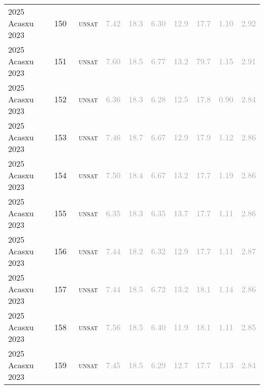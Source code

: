 \begin{center}
{\begin{longtable}{@{}llllllllll@{}}
2025 Acasxu 2023 & 150 & ~\textsc{unsat} & \textcolor{darkgray}{7.42} & \textcolor{darkgray}{18.3} & \textcolor{darkgray}{6.30} & \textcolor{darkgray}{12.9} & \textcolor{darkgray}{17.7} & \textcolor{darkgray}{1.10} & \textcolor{darkgray}{2.92} \\
2025 Acasxu 2023 & 151 & ~\textsc{unsat} & \textcolor{darkgray}{7.60} & \textcolor{darkgray}{18.5} & \textcolor{darkgray}{6.77} & \textcolor{darkgray}{13.2} & \textcolor{darkgray}{79.7} & \textcolor{darkgray}{1.15} & \textcolor{darkgray}{2.91} \\
2025 Acasxu 2023 & 152 & ~\textsc{unsat} & \textcolor{darkgray}{6.36} & \textcolor{darkgray}{18.3} & \textcolor{darkgray}{6.28} & \textcolor{darkgray}{12.5} & \textcolor{darkgray}{17.8} & \textcolor{darkgray}{0.90} & \textcolor{darkgray}{2.84} \\
2025 Acasxu 2023 & 153 & ~\textsc{unsat} & \textcolor{darkgray}{7.46} & \textcolor{darkgray}{18.7} & \textcolor{darkgray}{6.67} & \textcolor{darkgray}{12.9} & \textcolor{darkgray}{17.9} & \textcolor{darkgray}{1.12} & \textcolor{darkgray}{2.86} \\
2025 Acasxu 2023 & 154 & ~\textsc{unsat} & \textcolor{darkgray}{7.50} & \textcolor{darkgray}{18.4} & \textcolor{darkgray}{6.67} & \textcolor{darkgray}{13.2} & \textcolor{darkgray}{17.7} & \textcolor{darkgray}{1.19} & \textcolor{darkgray}{2.86} \\
2025 Acasxu 2023 & 155 & ~\textsc{unsat} & \textcolor{darkgray}{6.35} & \textcolor{darkgray}{18.3} & \textcolor{darkgray}{6.35} & \textcolor{darkgray}{13.7} & \textcolor{darkgray}{17.7} & \textcolor{darkgray}{1.11} & \textcolor{darkgray}{2.86} \\
2025 Acasxu 2023 & 156 & ~\textsc{unsat} & \textcolor{darkgray}{7.44} & \textcolor{darkgray}{18.2} & \textcolor{darkgray}{6.32} & \textcolor{darkgray}{12.9} & \textcolor{darkgray}{17.7} & \textcolor{darkgray}{1.11} & \textcolor{darkgray}{2.87} \\
2025 Acasxu 2023 & 157 & ~\textsc{unsat} & \textcolor{darkgray}{7.44} & \textcolor{darkgray}{18.5} & \textcolor{darkgray}{6.72} & \textcolor{darkgray}{13.2} & \textcolor{darkgray}{18.1} & \textcolor{darkgray}{1.14} & \textcolor{darkgray}{2.86} \\
2025 Acasxu 2023 & 158 & ~\textsc{unsat} & \textcolor{darkgray}{7.56} & \textcolor{darkgray}{18.5} & \textcolor{darkgray}{6.40} & \textcolor{darkgray}{11.9} & \textcolor{darkgray}{18.1} & \textcolor{darkgray}{1.11} & \textcolor{darkgray}{2.85} \\
2025 Acasxu 2023 & 159 & ~\textsc{unsat} & \textcolor{darkgray}{7.45} & \textcolor{darkgray}{18.5} & \textcolor{darkgray}{6.29} & \textcolor{darkgray}{12.7} & \textcolor{darkgray}{17.7} & \textcolor{darkgray}{1.13} & \textcolor{darkgray}{2.84} \\

\end{longtable}}
\end{center}
